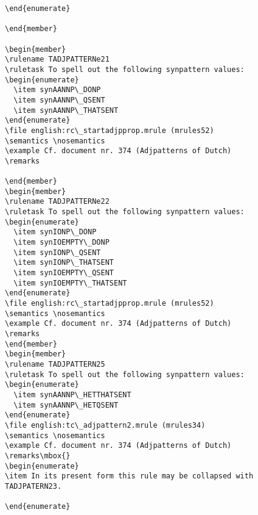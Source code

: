 \begin{verbatim}
\end{enumerate}

\end{member}

\begin{member}
\rulename TADJPATTERNe21
\ruletask To spell out the following synpattern values:
\begin{enumerate}
  \item synAANNP\_DONP
  \item synAANNP\_QSENT
  \item synAANNP\_THATSENT
\end{enumerate}
\file english:rc\_startadjpprop.mrule (mrules52)
\semantics \nosemantics
\example Cf. document nr. 374 (Adjpatterns of Dutch)
\remarks

\end{member}
\begin{member}
\rulename TADJPATTERNe22
\ruletask To spell out the following synpattern values:
\begin{enumerate}
  \item synIONP\_DONP
  \item synIOEMPTY\_DONP
  \item synIONP\_QSENT
  \item synIONP\_THATSENT
  \item synIOEMPTY\_QSENT
  \item synIOEMPTY\_THATSENT
\end{enumerate}
\file english:rc\_startadjpprop.mrule (mrules52)
\semantics \nosemantics
\example Cf. document nr. 374 (Adjpatterns of Dutch)
\remarks
\end{member}
\begin{member}
\rulename TADJPATTERN25
\ruletask To spell out the following synpattern values:
\begin{enumerate}
  \item synAANNP\_HETTHATSENT
  \item synAANNP\_HETQSENT 
\end{enumerate}
\file english:tc\_adjpattern2.mrule (mrules34)
\semantics \nosemantics
\example Cf. document nr. 374 (Adjpatterns of Dutch)
\remarks\mbox{}
\begin{enumerate}
\item In its present form this rule may be collapsed with TADJPATERN23.

\end{enumerate}


\end{verbatim}
